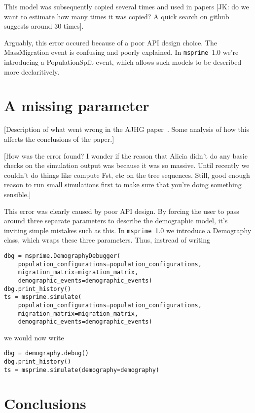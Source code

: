 \documentclass{article}
\newcommand{\msprime}[0]{\texttt{msprime}}
\begin{document}
This model was subsequently copied
several times and used in papers [JK: do we want to estimate how
many times it was copied? A quick search on github suggests around 30
times].

Arguably, this error occured because of a poor API design choice.
The MassMigration event is confusing and poorly explained. In
\msprime\ 1.0 we're introducing a PopulationSplit event, which allows
such models to be described more declaritively.

\section{A missing parameter}

[Description of what went wrong in the AJHG paper~\citep{martin2017human}.
Some analysis of how this affects the conclusions of the paper.]

[How was the error found? I wonder if the reason that Alicia didn't
do any basic checks on the simulation output was because it was
so massive. Until recently we couldn't do things like compute Fst, etc
on the tree sequences. Still, good enough reason to run small simulations
first to make sure that you're doing something sensible.]

This error was clearly caused by poor API design. By forcing the user to
pass around three separate parameters to describe the demographic model,
it's inviting simple mistakes such as this. In \msprime\ 1.0 we introduce
a Demography class, which wraps these three parameters.
Thus, instread of writing
\begin{lstlisting}[frame=single]
dbg = msprime.DemographyDebugger(
    population_configurations=population_configurations,
    migration_matrix=migration_matrix,
    demographic_events=demographic_events)
dbg.print_history()
ts = msprime.simulate(
    population_configurations=population_configurations,
    migration_matrix=migration_matrix,
    demographic_events=demographic_events)
\end{lstlisting}
we would now write
\begin{lstlisting}[frame=single]
dbg = demography.debug()
dbg.print_history()
ts = msprime.simulate(demography=demography)
\end{lstlisting}

\section{Conclusions}
\end{document}
